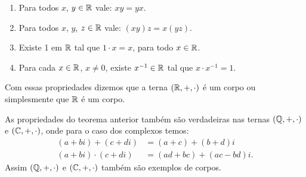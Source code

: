 \documentclass{beamer}
\begin{document}
    \begin{frame}
      \begin{teorema}
            \begin{enumerate}[label={\roman*})]
              \conti
              \item Para todos $x$, $y \in \mathbb{R}$ vale: $xy = yx$.

              \item Para todos $x$, $y$, $z \in \mathbb{R}$ vale: $(xy)z = x(yz)$.

              \item Existe 1 em $\mathbb{R}$ tal que $1\cdot x = x$, para todo $x \in \mathbb{R}$.

              \item Para cada $x \in \mathbb{R}$, $x \ne 0$, existe $x^{-1} \in \mathbb{R}$ tal
                que $x\cdot x^{-1} = 1$.
            \end{enumerate}
            Com essas propriedades dizemos que a terna $(\mathbb{R}, +, \cdot)$ é um corpo ou simplesmente que $\mathbb{R}$ é um corpo.
      \end{teorema}

      \begin{observacao}
        As propriedades do teorema anterior também são verdadeiras nas ternas
        $(\mathbb{Q}, +, \cdot)$ e $(\mathbb{C}, +, \cdot)$, onde para o caso dos
        complexos temos:
        \begin{align*}
          (a + bi) + (c + di) &= (a + c) + (b + d)i\\
          (a + bi)\cdot(c + di) &= (ad + bc) + (ac - bd)i.
        \end{align*}
        Assim $(\mathbb{Q}, +, \cdot)$ e $(\mathbb{C}, +, \cdot)$ também são exemplos de
        corpos.
      \end{observacao}
    \end{frame}
\end{document}
